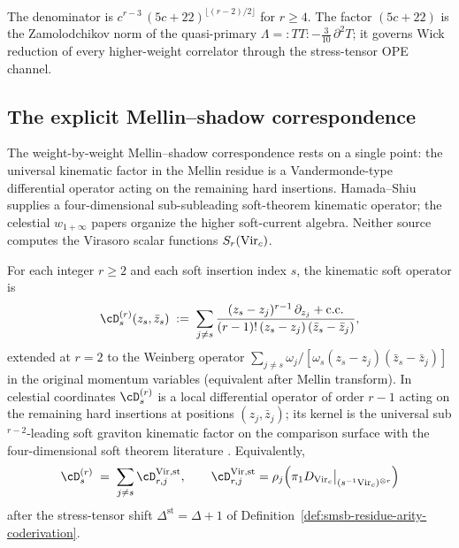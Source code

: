 \begin{remark}
\label{rem:smsb-pole-structure}
The denominator is $c^{r - 3}\,(5 c + 22)^{\lfloor (r - 2)/2 \rfloor}$
for $r \geq 4$. The factor $(5 c + 22)$ is the Zamolodchikov norm of
the quasi-primary $\Lambda = {:}T T{:} - \tfrac{3}{10}\,\partial^{2} T$;
it governs Wick reduction of every higher-weight correlator through the
stress-tensor OPE channel.
\end{remark}

\subsection{The explicit Mellin--shadow correspondence}
\label{subsec:smsb-bridge}

The weight-by-weight Mellin--shadow correspondence rests on a single point:
the universal kinematic factor in the Mellin residue is a
Vandermonde-type differential operator
acting on the remaining hard insertions.  Hamada--Shiu
\cite{HamadaShiuSubsubSoft} supplies a four-dimensional
sub-subleading soft-theorem kinematic operator; the celestial
\(w_{1+\infty}\) papers
\cite{GuevaraHimwichPateStrominger21,StromingerWInfinityCelestial}
organize the higher soft-current algebra.  Neither source computes the
Virasoro scalar functions \(S_r(\mathrm{Vir}_c)\).

\begin{definition}
\label{def:smsb-kinematic-op}
\ClaimStatusProvedHere
For each integer $r \geq 2$ and each soft insertion index $s$, the
kinematic soft operator is
\[
 \cD_s^{(r)}(z_s, \bar z_s)
 \;:=\;
 \sum_{j \neq s}
 \frac{(z_s - z_j)^{r - 1}\,\partial_{z_j} + \text{c.c.}}{(r - 1)!\,
 (z_s - z_j)\,(\bar z_s - \bar z_j)},
\]
extended at $r = 2$ to the Weinberg operator $\sum_{j \neq s}
\omega_j / [\omega_s (z_s - z_j)(\bar z_s - \bar z_j)]$ in the original
momentum variables (equivalent after Mellin transform). In celestial
coordinates $\cD_s^{(r)}$ is a local differential operator of order
$r - 1$ acting on the remaining hard insertions at positions $(z_j,
\bar z_j)$; its kernel is the universal sub${}^{r-2}$-leading soft
graviton kinematic factor on the comparison surface with the
four-dimensional soft theorem literature
\cite{HamadaShiuSubsubSoft,GuevaraHimwichPateStrominger21,
StromingerWInfinityCelestial}.
Equivalently,
\[
 \cD_s^{(r)}
 \;=\;
 \sum_{j\neq s}\cD^{\Vir,\mathrm{st}}_{r,j},
 \qquad
 \cD^{\Vir,\mathrm{st}}_{r,j}
 =
 \rho_j\!\left(
 \pi_1D_{\Vir_c}\big|_{(s^{-1}\Vir_c)^{\otimes r}}
 \right)
\]
after the stress-tensor shift $\Delta^{\mathrm{st}}=\Delta+1$ of
Definition~\ref{def:smsb-residue-arity-coderivation}.
\end{definition}

